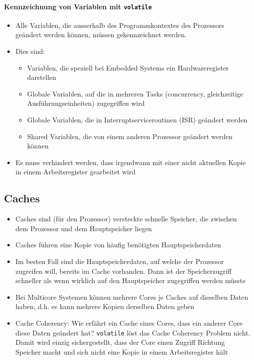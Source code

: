 \paragraph{Kennzeichnung von Variablen mit \lstinline{volatile}}
\begin{itemize}
	\item Alle Variablen, die ausserhalb des Programmkontextes des Prozessors geändert werden können, müssen gekennzeichnet werden.
	\item Dies sind:
	\begin{itemize}
		\item Variablen, die speziell bei Embedded Systems ein Hardwareregister darstellen
		\item Globale Variablen, auf die in mehreren Tasks (concurrency, gleichzeitige Ausführungseinheiten) zugegriffen wird
		\item Globale Variablen, die in Interruptserviceroutinen (ISR) geändert werden
		\item Shared Variablen, die von einem anderen Prozessor geändert werden können
	\end{itemize}
	\item Es muss verhindert werden, dass irgendwann mit einer nicht aktuellen Kopie in einem Arbeitsregister gearbeitet wird
\end{itemize}

\subsection{Caches}
\begin{itemize}
	\item Caches sind (für den Prozessor) versteckte schnelle Speicher, die zwischen dem Prozessor und dem Hauptspeicher liegen
	\item Caches führen eine Kopie von häufig benötigten Hauptspeicherdaten
	\item Im besten Fall sind die Hauptspeicherdaten, auf welche der Prozessor zugreifen will, bereits im Cache vorhanden.  Dann ist der Speicherzugriff schneller als wenn wirklich auf den Hauptspeicher zugegriffen werden müsste
	\item Bei Multicore Systemen können mehrere Cores je Caches auf dieselben Daten haben, d.h. es kann mehrere Kopien derselben Daten geben
	\item Cache Coherency: Wie erfährt ein Cache eines Cores, dass ein anderer Core diese Daten geändert hat? \lstinline{volatile} löst das Cache Coherency Problem nicht. Damit wird einzig sichergestellt, dass der Core einen Zugriff Richtung Speicher macht und sich nicht eine Kopie in einem Arbeitsregister hält
\end{itemize}

